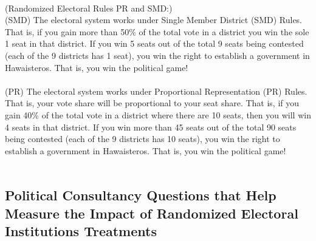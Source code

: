 \documentclass{article}
\begin{document}
\\
(Randomized Electoral Rules PR and SMD:)\\
(SMD) The electoral system works under Single Member District (SMD) Rules. That is, if you gain more than 50\% of the total vote in a district you win the sole 1 seat in that district. If you win 5 seats out of the total 9 seats being contested (each of the 9 districts has 1 seat), you win the right to establish a government in Hawaisteros. That is, you win the political game!\\
\\
(PR) The electoral system works under Proportional Representation (PR) Rules. That is, your vote share will be proportional to your seat share. That is, if you gain 40\% of the total vote in a district where there are 10 seats, then you will win 4 seats in that district. If you win more than 45 seats out of the total 90 seats being contested (each of the 9 districts has 10 seats), you win the right to establish a government in Hawaisteros. That is, you win the political game!\\
\\
\subsection{Political Consultancy Questions that Help Measure the Impact of Randomized Electoral Institutions Treatments}
\\
\\
\\
\\
\end{document}
